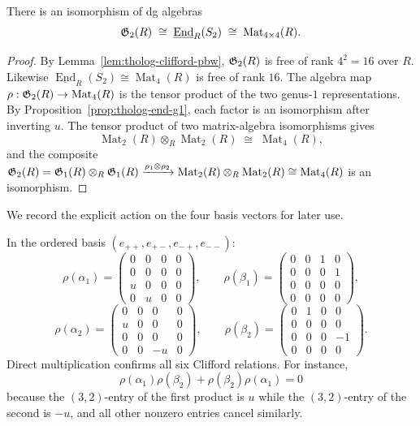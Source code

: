 \begin{proposition}
\label{prop:tholog-end-g2}
There is an isomorphism of dg algebras
\[
\mathfrak{G}_2(R)
\;\cong\;
\underline{\operatorname{End}}_R(S_2)
\;\cong\;
\operatorname{Mat}_{4 \times 4}(R).
\]
\end{proposition}

\begin{proof}
By Lemma~\ref{lem:tholog-clifford-pbw}, $\mathfrak{G}_2(R)$ is free of
rank $4^2 = 16$ over $R$.
Likewise $\underline{\operatorname{End}}_R(S_2) \cong \operatorname{Mat}_4(R)$
is free of rank $16$.
The algebra map
$\rho : \mathfrak{G}_2(R) \to \operatorname{Mat}_4(R)$
is the tensor product of the two genus-$1$ representations.
By Proposition~\ref{prop:tholog-end-g1}, each factor is an
isomorphism after inverting $u$.
The tensor product of two matrix-algebra isomorphisms gives
\[
\operatorname{Mat}_2(R) \otimes_R \operatorname{Mat}_2(R)
\;\cong\;
\operatorname{Mat}_4(R),
\]
and the composite
$\mathfrak{G}_2(R) = \mathfrak{G}_1(R) \otimes_R \mathfrak{G}_1(R)
\xrightarrow{\rho_1 \otimes \rho_2}
\operatorname{Mat}_2(R) \otimes_R \operatorname{Mat}_2(R)
\cong \operatorname{Mat}_4(R)$
is an isomorphism.
\end{proof}

We record the explicit action on the four basis vectors
for later use.

\begin{computation}
In the ordered basis $(e_{++}, e_{+-}, e_{-+}, e_{--})$:
\[
\rho(\alpha_1) = \begin{pmatrix}
0 & 0 & 0 & 0 \\
0 & 0 & 0 & 0 \\
u & 0 & 0 & 0 \\
0 & u & 0 & 0
\end{pmatrix},\qquad
\rho(\beta_1) = \begin{pmatrix}
0 & 0 & 1 & 0 \\
0 & 0 & 0 & 1 \\
0 & 0 & 0 & 0 \\
0 & 0 & 0 & 0
\end{pmatrix},
\]
\[
\rho(\alpha_2) = \begin{pmatrix}
0 & 0 & 0 & 0 \\
u & 0 & 0 & 0 \\
0 & 0 & 0 & 0 \\
0 & 0 & -u & 0
\end{pmatrix},\qquad
\rho(\beta_2) = \begin{pmatrix}
0 & 1 & 0 & 0 \\
0 & 0 & 0 & 0 \\
0 & 0 & 0 & -1 \\
0 & 0 & 0 & 0
\end{pmatrix}.
\]
Direct multiplication confirms all six Clifford relations.
For instance,
\[
\rho(\alpha_1)\rho(\beta_2) + \rho(\beta_2)\rho(\alpha_1) = 0
\]
because the $(3,2)$-entry of the first product is $u$ while
the $(3,2)$-entry of the second is $-u$, and all other
nonzero entries cancel similarly.
\end{computation}

